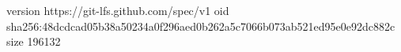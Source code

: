 version https://git-lfs.github.com/spec/v1
oid sha256:48dcdcad05b38a50234a0f296aed0b262a5c7066b073ab521ed95e0e92dc882c
size 196132
